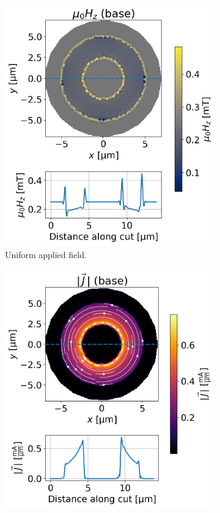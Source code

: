 \documentclass[final,3p,times]{elsarticle}
\begin{document}
\begin{figure}[!h]
\begin{subfigure}{.235\textwidth}
  \includegraphics[width=\linewidth]{examples/images/ring/circular_ring_uniform_plot_fields.png}
  \caption{Uniform applied field.}
  \label{fig:circular_ring_plot_fields}
\end{subfigure}
\begin{subfigure}{.235\textwidth}
  \centering
  \includegraphics[width=\linewidth]{examples/images/ring/circular_ring_circ_plot_currents.png}

\end{subfigure}
\end{figure}
\end{document}
